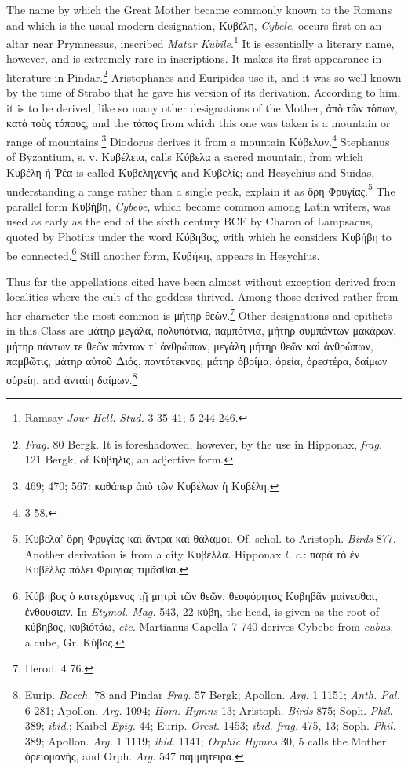 \documentclass[a4paper, 11pt, oneside, polutonikogreek, french]{article}
\begin{document}
The name by which the Great Mother became commonly known to the Romans and which is the usual modern designation, Κυβέλη, \emph{Cybele}, occurs first on an altar near Prymnessus, inscribed \emph{Matar Kubile}.\footnote{Ramsay \emph{Jour Hell. Stud.} 3 35-41; 5 244-246.} It is essentially a literary name, however, and is extremely rare in inscriptions. It makes its first appearance in literature in Pindar.\footnote{\emph{Frag.} 80 Bergk. It is foreshadowed, however, by the use in Hipponax, \emph{frag.} 121 Bergk, of Κὑβηλις, an adjective form.} Aristophanes and Euripides use it, and it was so well known by the time of Strabo that he gave his version of its derivation. According to him, it is to be derived, like so many other designations of the Mother, ἀπὸ τῶν τόπων, κατὰ τοὺς τόπους, and the τόπος from which this one was taken is a mountain or range of mountains.\footnote{469; 470; 567: καθάπερ ἀπὸ τῶν Κυβέλων ἡ Κυβέλη.} Diodorus derives it from a mountain Κύβελον.\footnote{3 58.} Stephanus of Byzantium, s. v. Κυβέλεια, calls Κύβελα a sacred mountain, from which Κυβέλη ἡ Ῥέα is called Κυβεληγενής and Κυβελίς; and Hesychius and Suidas, understanding a range rather than a single peak, explain it as ὄρη Φρυγίας.\footnote{Κυβελα' ὄρη Φρυγίας καὶ ἄντρα καὶ θάλαμοι. Of. schol. to Aristoph. \emph{Birds} 877. Another derivation is from a city Κυβέλλα. Hipponax \emph{l. c.}: παρὰ τὸ ἐν Κυβέλλᾳ πόλει Φρυγίας τιμᾶσθαι.} The parallel form Κυβήβη, \emph{Cybebe}, which became common among Latin writers, was used as early as the end of the sixth century \textsc{BCE} by Charon of Lampsacus, quoted by Photius under the word Κύβηβος, with which he considers Κυβήβη to be connected.\footnote{Κύβηβος ὁ κατεχόμενος τῇ μητρὶ τῶν θεῶν, θεοφόρητος Κυβηβᾶν μαίνεσθαι, ἐνθουσιαν. In \emph{Etymol. Mag.} 543, 22 κύβη, the head, is given as the root of κύβηβος, κυβιότάω, \emph{etc.} Martianus Capella 7 740 derives Cybebe from \emph{cubus}, a cube, Gr. Κύβος.} Still another form, Κυβήκη, appears in Hesychius.

Thus far the appellations cited have been almost without exception derived from localities where the cult of the goddess thrived. Among those derived rather from her character the most common is μήτηρ θεῶν.\footnote{Herod. 4 76.} Other designations and epithets in this Class are μάτηρ μεγάλα, πολυπότνια, παμπότνια, μήτηρ συμπάντων μακάρων, μήτηρ πάντων τε θεῶν πάντων τ᾽ ἀνθρώπων, μεγάλη μήτηρ θεῶν καὶ ἀνθρώπων, παμβῶτις, μάτηρ αὐτοῦ Διός, παντότεκνος, μάτηρ ὀβρίμα, ὀρεία, ὀρεστέρα, δαίμων οὐρείη, and ἀνταίη δαίμων.\footnote{Eurip. \emph{Bacch.} 78 and Pindar \emph{Frag.} 57 Bergk; Apollon. \emph{Arg.} 1 1151; \emph{Anth. Pal.} 6 281; Apollon. \emph{Arg.} 1094; \emph{Hom. Hymns} 13; Aristoph. \emph{Birds} 875; Soph. \emph{Phil.} 389; \emph{ibid.}; Kaibel \emph{Epig.} 44; Eurip. \emph{Orest.} 1453; \emph{ibid.} \emph{frag.} 475, 13; Soph. \emph{Phil.} 389; Apollon. \emph{Arg.} 1 1119; \emph{ibid.} 1141; \emph{Orphic Hymns} 30, 5 calls the Mother ὀρειομανής, and Orph. \emph{Arg.} 547 παμμητειρα.}
\end{document}
